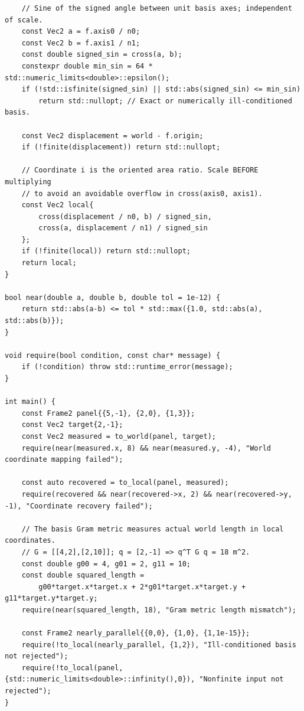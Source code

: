 \begin{verbatim}
    // Sine of the signed angle between unit basis axes; independent of scale.
    const Vec2 a = f.axis0 / n0;
    const Vec2 b = f.axis1 / n1;
    const double signed_sin = cross(a, b);
    constexpr double min_sin = 64 * std::numeric_limits<double>::epsilon();
    if (!std::isfinite(signed_sin) || std::abs(signed_sin) <= min_sin)
        return std::nullopt; // Exact or numerically ill-conditioned basis.

    const Vec2 displacement = world - f.origin;
    if (!finite(displacement)) return std::nullopt;

    // Coordinate i is the oriented area ratio. Scale BEFORE multiplying
    // to avoid an avoidable overflow in cross(axis0, axis1).
    const Vec2 local{
        cross(displacement / n0, b) / signed_sin,
        cross(a, displacement / n1) / signed_sin
    };
    if (!finite(local)) return std::nullopt;
    return local;
}

bool near(double a, double b, double tol = 1e-12) {
    return std::abs(a-b) <= tol * std::max({1.0, std::abs(a), std::abs(b)});
}

void require(bool condition, const char* message) {
    if (!condition) throw std::runtime_error(message);
}

int main() {
    const Frame2 panel{{5,-1}, {2,0}, {1,3}};
    const Vec2 target{2,-1};
    const Vec2 measured = to_world(panel, target);
    require(near(measured.x, 8) && near(measured.y, -4), "World coordinate mapping failed");

    const auto recovered = to_local(panel, measured);
    require(recovered && near(recovered->x, 2) && near(recovered->y, -1), "Coordinate recovery failed");

    // The basis Gram metric measures actual world length in local coordinates.
    // G = [[4,2],[2,10]]; q = [2,-1] => q^T G q = 18 m^2.
    const double g00 = 4, g01 = 2, g11 = 10;
    const double squared_length =
        g00*target.x*target.x + 2*g01*target.x*target.y + g11*target.y*target.y;
    require(near(squared_length, 18), "Gram metric length mismatch");

    const Frame2 nearly_parallel{{0,0}, {1,0}, {1,1e-15}};
    require(!to_local(nearly_parallel, {1,2}), "Ill-conditioned basis not rejected");
    require(!to_local(panel, {std::numeric_limits<double>::infinity(),0}), "Nonfinite input not rejected");
}
\end{verbatim}

